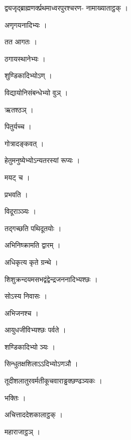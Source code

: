 \documentclass[10pt, openany]{book}
\begin{document}
\noindent द्व्यजृद्ब्राह्मणर्क्प्रथमाध्वरपुरश्चरण- नामाख्याताट्ठक् ।

\noindent अणृगयनादिभ्यः ।

\noindent तत आगतः ।

\noindent ठगायस्थानेभ्यः ।

\noindent शुण्डिकादिभ्योऽण् ।

\noindent विद्यायोनिसंबन्धेभ्यो वुञ् ।

\noindent ऋतश्ठञ् ।

\noindent पितुर्यच्च ।

\noindent गोत्रादङ्कवत् ।

\noindent हेतुमनुष्येभ्योऽन्यतरस्यां रूप्यः ।

\noindent मयट् च ।

\noindent प्रभवति ।

\noindent विदूराञ्ञ्यः ।

\noindent तद्गच्छति पथिदूतयोः ।

\noindent अभिनिष्क्रामति द्वारम् ।

\noindent अधिकृत्य कृते ग्रन्थे ।

\noindent शिशुक्रन्दयमसभद्वंद्वेन्द्रजननादिभ्यश्छः ।

\noindent सोऽस्य निवासः ।

\noindent अभिजनश्च ।

\noindent आयुधजीविभ्यश्छः पर्वते ।

\noindent शण्डिकादिभ्यो ञ्यः ।

\noindent सिन्धुतक्षशिलाऽऽदिभ्योऽणञौ ।

\noindent तूदीशलातुरवर्मतीकूचवाराड्ढक्छण्ढञ्यकः ।

\noindent भक्तिः ।

\noindent अचित्ताददेशकालाट्ठक् ।

\noindent महाराजाट्ठञ् ।
\end{document}
